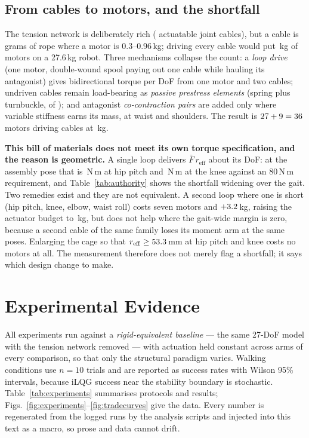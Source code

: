 \documentclass[conference]{IEEEtran}
\newcommand{\Fmax}{\bar{F}}
\begin{document}
\subsection{From cables to motors, and the shortfall}
The tension network is deliberately rich (\numActuatable{} actuatable joint
cables), but a cable is grams of rope where a motor is 0.3--0.96\,kg; driving
every cable would put \allMotorMass\,kg of motors on a 27.6\,kg robot. Three
mechanisms collapse the count: a \emph{loop drive} (one motor, double-wound
spool paying out one cable while hauling its antagonist) gives bidirectional
torque per DoF from one motor and two cables; undriven cables remain
load-bearing as \emph{passive prestress elements} (spring plus turnbuckle,
\numPassiveCables{} of \numActuatable{}); and antagonist
\emph{co-contraction pairs} are added only where variable stiffness earns its
mass, at waist and shoulders. The result is $27+9=36{}$ motors driving
\numDrivenCables{} cables at \bomMass\,kg.

\textbf{This bill of materials does not meet its own torque specification, and
the reason is geometric.} A single loop delivers $\Fmax\,r_{\mathrm{eff}}$
about its DoF: at the assembly pose that is \singleLoopHip\,N\,m at hip pitch
and \singleLoopKnee\,N\,m at the knee against an 80\,N\,m requirement, and
Table~\ref{tab:authority} shows the shortfall widening over the gait. Two
remedies exist and they are not equivalent. A second loop where one is short
(hip pitch, knee, elbow, waist roll) costs seven motors and
$+3.2$\,kg, raising the actuator budget to \bomMassFixed\,kg, but
does not help where the gait-wide margin is zero, because a second cable of
the same family loses its moment arm at the same poses. Enlarging the cage so
that $r_{\mathrm{eff}}\ge53.3$\,mm at hip pitch and knee costs no motors
at all. The measurement therefore does not merely flag a shortfall; it says
which design change to make.

\section{Experimental Evidence}
\label{sec:evidence}
All experiments run against a \emph{rigid-equivalent baseline} --- the same
27-DoF model with the tension network removed --- with actuation held constant
across arms of every comparison, so that only the structural paradigm varies.
Walking conditions use $n=10$ trials and are reported as success rates with
Wilson 95\% intervals, because iLQG success near the stability boundary is
stochastic. Table~\ref{tab:experiments} summarises protocols and results;
Figs.~\ref{fig:experiments}--\ref{fig:tradecurves} give the data. Every number
is regenerated from the logged runs by the analysis scripts and injected into
this text as a macro, so prose and data cannot drift.
\end{document}
